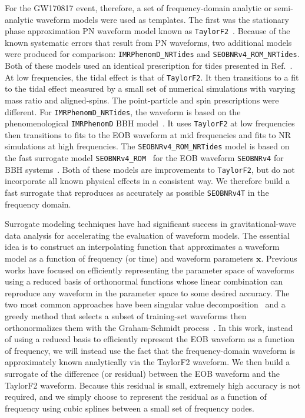 \documentclass[prd,aps,letter,twocolumn,floatfix,notitlepage,nofootinbib]{revtex4-1}
\def\bx{\mathbf{x}}
\begin{document}
For the GW170817 event, therefore, a set of frequency-domain analytic or semi-analytic waveform models were used as templates. The first was the stationary phase approximation PN waveform model known as \texttt{TaylorF2}~\cite{BuonannoIyerOchsner2009}. Because of the known systematic errors that result from PN waveforms, two additional models were produced for comparison: \texttt{IMRPhenomD\_NRTides} and \texttt{SEOBNRv4\_ROM\_NRTides}. Both of these models used an identical prescription for tides presented in Ref.~\cite{DietrichBernuzziTichy2017}. At low frequencies, the tidal effect is that of \texttt{TaylorF2}. It then transitions to a fit to the tidal effect measured by a small set of numerical simulations with varying mass ratio and aligned-spins. The point-particle and spin prescriptions were different. For \texttt{IMRPhenomD\_NRTides}, the waveform is based on the phenomenological \texttt{IMRPhenomD} BBH model~\cite{HusaKhanHannam2016, KhanHusaHannam2016}. It uses \texttt{TaylorF2} at low frequencies then transitions to fits to the EOB waveform at mid frequencies and fits to NR simulations at high frequencies. The \texttt{SEOBNRv4\_ROM\_NRTides} model is based on the fast surrogate model \texttt{SEOBNRv4\_ROM}~\cite{Puerrer2015} for the EOB waveform \texttt{SEOBNRv4} for BBH systems~\cite{Bohe:2016gbl}. Both of these models are improvements to \texttt{TaylorF2}, but do not incorporate all known physical effects in a consistent way. We therefore build a fast surrogate that reproduces as accurately as possible \texttt{SEOBNRv4T} in the frequency domain.

Surrogate modeling techniques have had significant success in gravitational-wave data analysis for accelerating the evaluation of waveform models. The essential idea is to construct an interpolating function that approximates a waveform model as a function of frequency (or time) and waveform parameters $\bx$. Previous works have focused on efficiently representing the parameter space of waveforms using a reduced basis of orthonormal functions whose linear combination can reproduce any waveform in the parameter space to some desired accuracy. The two most common approaches have been singular value decomposition~\cite{Puerrer2014, Puerrer2015} and a greedy method that selects a subset of training-set waveforms then orthonormalizes them with the Graham-Schmidt process~\cite{FieldGalleyHesthaven2014, LackeyBernuzziGalley2017, BlackmanFieldGalley2015, BlackmanFieldScheel2017a, BlackmanFieldScheel2017b}. In this work, instead of using a reduced basis to efficiently represent the EOB waveform as a function of frequency, we will instead use the fact that the frequency-domain waveform is approximately known analytically via the TaylorF2 waveform. We then build a surrogate of the difference (or residual) between the EOB waveform and the TaylorF2 waveform. Because this residual is small, extremely high accuracy is not required, and we simply choose to represent the residual as a function of frequency using cubic splines between a small set of frequency nodes.
\end{document}
